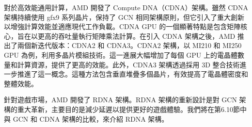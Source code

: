 \vspace{1em}
對於高效能通用計算，AMD 開發了 Compute DNA（CDNA）架構。雖然 CDNA 架構持續使用 gfx9 系列晶片，保持了 GCN 相同架構原則，但它引入了重大創新以增強計算效能並適應現代工作負載。CDNA GPU 的一個顯著特點是包含矩陣核心，旨在以更高的吞吐量執行矩陣乘法計算。在引入 CDNA 架構之後，AMD 推出了兩個新迭代版本：CDNA2 和 CDNA3。CDNA2 架構，以 MI210 和 MI250 GPU 為例，利用多晶片模組技術。這一進展大幅增加了每個 GPU 上的電晶體數量和計算資源，提供了更高的效能。此外，CDNA3 架構透過採用 3D 整合技術進一步推進了這一概念。這種方法包含垂直堆疊多個晶片，有效提高了電晶體密度和整體效能。

\vspace{1em}
針對遊戲市場，AMD 開發了 RDNA 架構。RDNA 架構的重新設計是對 GCN 架構的重大革新，主要目的是減少延遲以提供更好的遊戲體驗。我們將在第6.10節中與 GCN 和 CDNA 架構的比較，來介紹 RDNA 架構。

